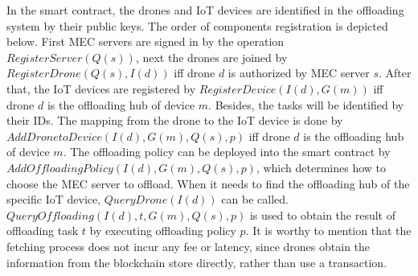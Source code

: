 In the smart contract,  the drones and IoT devices are identified in the offloading system by their public keys.
The order of components registration is depicted below.
First MEC servers are signed in by the operation $RegisterServer(Q(s))$, next the drones are joined by  $RegisterDrone(Q(s), I(d))$ iff drone $d$ is authorized by MEC server $s$.
After that, the IoT devices are registered by $RegisterDevice(I(d), G(m))$ iff drone $d$ is the offloading hub of device $m$. 
Besides, the tasks will be identified by their IDs.
The mapping from the drone to the IoT device is done by $AddDronetoDevice(I(d), G(m), Q(s), p)$ iff drone $d$ is the offloading hub of device $m$.
The offloading policy can be deployed into the smart contract by $AddOffloadingPolicy(I(d), G(m), Q(s), p)$, which determines how to choose the MEC server to offload.
When it needs to find the offloading hub of the specific IoT device, $QueryDrone(I(d))$ can be called.
$QueryOffloading(I(d), t, G(m), Q(s), p)$ is used to obtain the result of offloading task $t$ by executing offloading policy $p$.
It is worthy to mention that the fetching process does not incur any fee or latency, since drones obtain the information from the blockchain store directly, rather than use a transaction. 



